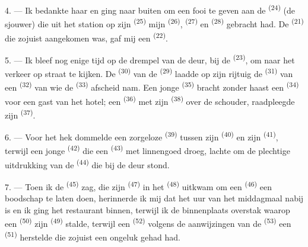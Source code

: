 4. --- Ik bedankte haar en ging naar buiten om een fooi te geven aan de
 \textsuperscript{(24)} (de sjouwer) die uit het station op zijn
 \textsuperscript{(25)} mijn 
\textsuperscript{(26)},  \textsuperscript{(27)} en
 \textsuperscript{(28)} gebracht had. De
 \textsuperscript{(21)} die zojuist aangekomen was, gaf
mij een  \textsuperscript{(22)}.

5. --- Ik bleef nog enige tijd op de drempel van de deur, bij de
 \textsuperscript{(23)}, om naar het verkeer op straat te
kijken. De  \textsuperscript{(30)} van de 
\textsuperscript{(29)} laadde op zijn rijtuig de  \textsuperscript{(31)} van
een  \textsuperscript{(32)} van wie de 
\textsuperscript{(33)} afscheid nam. Een jonge
 \textsuperscript{(35)} bracht zonder haast een
 \textsuperscript{(34)} voor een gast van het hotel; een
 \textsuperscript{(36)} met zijn 
\textsuperscript{(38)} over de schouder, raadpleegde zijn 
\textsuperscript{(37)}.

\VUsaut{4.0mm}
\VUsaut{3.0mm}

6. --- Voor het hek dommelde een zorgeloze  \textsuperscript{(39)} tussen
zijn  \textsuperscript{(40)} en zijn 
\textsuperscript{(41)}, terwijl een jonge
 \textsuperscript{(42)} die een 
\textsuperscript{(43)} met linnengoed droeg, lachte om de plechtige uitdrukking van de
 \textsuperscript{(44)} die bij de deur stond.

7. --- Toen ik de  \textsuperscript{(45)} zag, die zijn
 \textsuperscript{(47)} in het 
\textsuperscript{(48)} uitkwam om een  \textsuperscript{(46)} een boodschap
te laten doen, herinnerde ik mij dat het uur van het middagmaal nabij is en ik ging het
restaurant binnen, terwijl ik de binnenplaats overstak waarop een 
\textsuperscript{(50)} zijn  \textsuperscript{(49)} stalde, terwijl een
 \textsuperscript{(52)} volgens de aanwijzingen van de
 \textsuperscript{(53)} een 
\textsuperscript{(51)} herstelde die zojuist een ongeluk gehad had.

